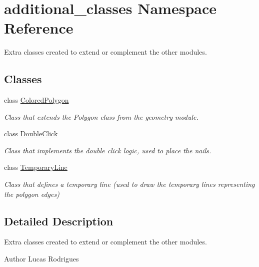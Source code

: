 \hypertarget{namespaceadditional__classes}{}\section{additional\+\_\+classes Namespace Reference}
\label{namespaceadditional__classes}


Extra classes created to extend or complement the other modules.  


\subsection*{Classes}
\begin{DoxyCompactItemize}
\item 
class \hyperlink{classadditional__classes_1_1ColoredPolygon}{Colored\+Polygon}
\begin{DoxyCompactList}\small\item\em Class that extends the Polygon class from the geometry module. \end{DoxyCompactList}\item 
class \hyperlink{classadditional__classes_1_1DoubleClick}{Double\+Click}
\begin{DoxyCompactList}\small\item\em Class that implements the double click logic, used to place the nails. \end{DoxyCompactList}\item 
class \hyperlink{classadditional__classes_1_1TemporaryLine}{Temporary\+Line}
\begin{DoxyCompactList}\small\item\em Class that defines a temporary line (used to draw the temporary lines representing the polygon edges) \end{DoxyCompactList}\end{DoxyCompactItemize}


\subsection{Detailed Description}
Extra classes created to extend or complement the other modules. 

\begin{DoxyAuthor}{Author}
Lucas Rodrigues 
\end{DoxyAuthor}
